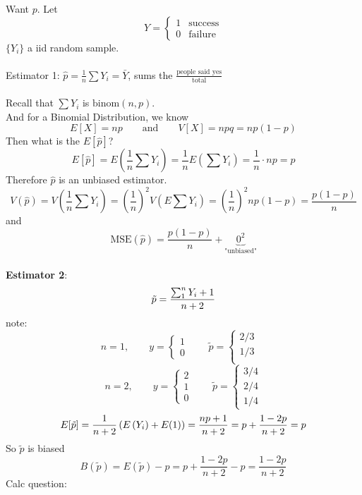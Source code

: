 \documentclass[12pt]{article}
\newcommand{\pars}[1]{\left( {#1} \right) }
\newcommand{\ybar}{\bar{Y}}
\renewcommand{\over}[1]{\frac{1}{{#1}}}
\begin{document}
Want $p$. Let
$$Y = \begin{cases} 
      1 & \text{success} \\
      0 & \text{failure} 
   \end{cases}$$
$\{Y_i\}$ a iid random sample.\\
\\Estimator 1: $\hat{p} = \over{n}\sum Y_i = \ybar$, sums the $\frac{\text{people said yes}}{\text{total}}$\\\\
Recall that $\sum Y_i$ is $\text{binom}(n,p)$.\vspace{0.35in}\\
And for a Binomial Distribution, we know
$$E[X] = np \qquad \text{and} \qquad V[X] = npq = np(1-p)$$
Then what is the $E[\hat{p}]$?
$$E[\hat{p}] = E\pars{\over{n}\sum Y_i} = \over{n}E\pars{\sum Y_i} = \over{n}\cdot np = p$$
Therefore $\hat{p}$ is an unbiased estimator.
$$V(\hat{p}) = V\pars{\over{n}\sum Y_i} = \pars{\over{n}}^2V\pars{E\sum Y_i} = \pars{\over{n}}^2 np(1-p) = \frac{p(1-p)}{n}$$
and $$\text{MSE}(\hat{p}) = \frac{p(1-p)}{n} + \underbrace{0^2}_{\text{"unbiased"}}$$
\\\textbf{Estimator 2}: 
$$\Tilde{p} = \frac{\sum_1^n Y_i + 1}{n+2}$$
note:
$$n = 1, \qquad y = \begin{cases} 
      1\\
      0
   \end{cases} \qquad \tilde{p} = \begin{cases} 
      2/3 & \\
      1/3 \\
   \end{cases}$$
   $$n = 2, \qquad y = \begin{cases} 
      2\\
      1\\
      0
   \end{cases} \qquad \tilde{p} = \begin{cases} 
      3/4 \\
      2/4\\
      1/4
   \end{cases}$$
$$E[\Tilde{p}] = \over{n+2}\pars{E\pars{Y_i} + E(1)} = \frac{np+1}{n+2} = p + \frac{1-2p}{n+2} = p$$
So $\tilde{p}$ is biased
$$B(\tilde{p}) = E(\tilde{p}) - p = p + \frac{1-2p}{n+2} - p = \frac{1-2p}{n+2}$$
Calc question:
\end{document}
